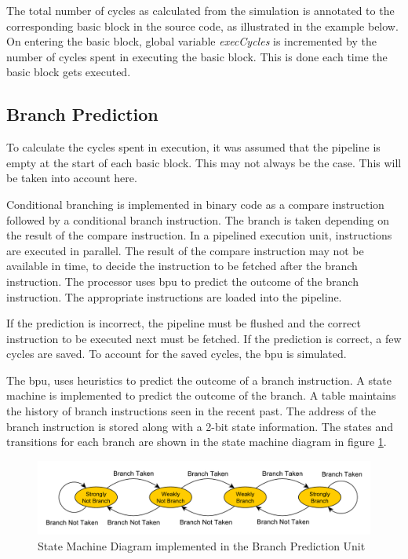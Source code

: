 The total number of cycles as calculated from the simulation is annotated to the corresponding basic block in the source code, as illustrated in the example below. On entering the basic block, global variable \emph{execCycles} is incremented by the number of cycles spent in executing the basic block. This is done each time the basic block gets executed.


\subsection{Branch Prediction}
To calculate the cycles spent in execution, it was assumed that the pipeline is empty at the start of each basic block. This may not always be the case. This will be taken into account here.

Conditional branching is implemented in binary code as a compare instruction followed by a conditional branch instruction. The branch is taken depending on the result of the compare instruction. In a pipelined execution unit, instructions are executed in parallel. The result of the compare instruction may not be available in time, to decide the instruction to be fetched after the branch instruction. The processor uses \gls{bpu} to predict the outcome of the branch instruction. The appropriate instructions are loaded into the pipeline.

If the prediction is incorrect, the pipeline must be flushed and the correct instruction to be executed next must be fetched. If the prediction is correct, a few cycles are saved. To account for the saved cycles, the \gls{bpu} is simulated.

The \gls{bpu}, uses heuristics to predict the outcome of a branch instruction. A state machine is implemented to predict the outcome of the branch. A table maintains the history of branch instructions seen in the recent past. The address of the branch instruction is stored along with a 2-bit state information. The states and transitions for each branch are shown in the state machine diagram in figure 
\ref{fig:bpuSMD}.

\begin{figure}[h]
\centering
\includegraphics[width=.8\textwidth]{figures/BranchPredictionSMD.pdf}
\caption{State Machine Diagram implemented in the Branch Prediction Unit}
\label{fig:bpuSMD}
\end{figure}

